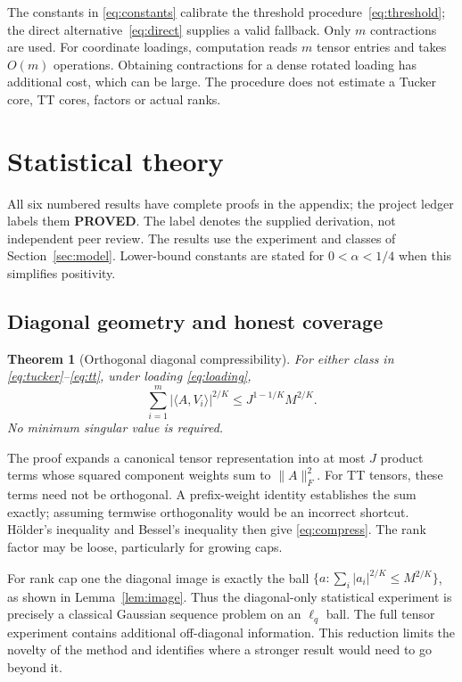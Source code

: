\documentclass[11pt]{article}
\newtheorem{theorem}{Theorem}
\theoremstyle{remark}
\newcommand{\ip}[2]{\langle #1,#2\rangle}
\newcommand{\norm}[1]{\lVert #1\rVert}
\begin{document}
The constants in \eqref{eq:constants} calibrate the threshold procedure~\eqref{eq:threshold}; the direct alternative~\eqref{eq:direct} supplies a valid fallback. Only $m$ contractions are used. For coordinate loadings, computation reads $m$ tensor entries and takes $O(m)$ operations. Obtaining contractions for a dense rotated loading has additional cost, which can be large. The procedure does not estimate a Tucker core, TT cores, factors or actual ranks.

\section{Statistical theory}\label{sec:theory}

All six numbered results have complete proofs in the appendix; the project ledger labels them \textbf{PROVED}. The label denotes the supplied derivation, not independent peer review. The results use the experiment and classes of Section~\ref{sec:model}. Lower-bound constants are stated for $0<\alpha<1/4$ when this simplifies positivity.

\subsection{Diagonal geometry and honest coverage}

\begin{theorem}[Orthogonal diagonal compressibility]\label{thm:diagonal}
For either class in \eqref{eq:tucker}--\eqref{eq:tt}, under loading \eqref{eq:loading},
\begin{equation}\label{eq:compress}
 \sum_{i=1}^m|\ip A{V_i}|^{2/K}\le J^{1-1/K}M^{2/K}.
\end{equation}
No minimum singular value is required.
\end{theorem}

The proof expands a canonical tensor representation into at most $J$ product terms whose squared component weights sum to $\norm A_F^2$. For TT tensors, these terms need not be orthogonal. A prefix-weight identity establishes the sum exactly; assuming termwise orthogonality would be an incorrect shortcut. H\"older's inequality and Bessel's inequality then give \eqref{eq:compress}. The rank factor may be loose, particularly for growing caps.

For rank cap one the diagonal image is exactly the ball $\{a:\sum_i|a_i|^{2/K}\le M^{2/K}\}$, as shown in Lemma~\ref{lem:image}. Thus the diagonal-only statistical experiment is precisely a classical Gaussian sequence problem on an $\ell_q$ ball. The full tensor experiment contains additional off-diagonal information. This reduction limits the novelty of the method and identifies where a stronger result would need to go beyond it.
\end{document}
